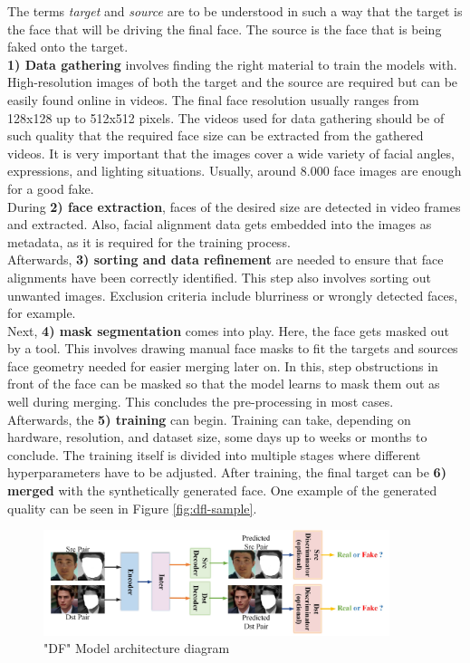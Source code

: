 \documentclass[
  a4paper,  %
  twoside,  %
  bibliography=totoc,
  headsepline,
  cleardoublepage=empty,
  parskip=half,
  draft=false
]{scrbook}
\begin{document}
The terms \textit{target} and \textit{source} are to be understood in such a way that the target is the face that will be driving the final face. The source is the face that is being faked onto the target. \\
\textbf{1) Data gathering} involves finding the right material to train the models with. High-resolution images of both the target and the source are required but can be easily found online in videos. The final face resolution usually ranges from 128x128 up to 512x512 pixels. The videos used for data gathering should be of such quality that the required face size can be extracted from the gathered videos. It is very important that the images cover a wide variety of facial angles, expressions, and lighting situations. Usually, around 8.000 face images are enough for a good fake. \\
During \textbf{2) face extraction}, faces of the desired size are detected in video frames and extracted. Also, facial alignment data gets embedded into the images as metadata, as it is required for the training process. \\
Afterwards, \textbf{3) sorting and data refinement} are needed to ensure that face alignments have been correctly identified. This step also involves sorting out unwanted images. Exclusion criteria include blurriness or wrongly detected faces, for example. \\
Next, \textbf{4) mask segmentation} comes into play. Here, the face gets masked out by a tool. This involves drawing manual face masks to fit the targets and sources face geometry needed for easier merging later on. In this, step obstructions in front of the face can be masked so that the model learns to mask them out as well during merging.  This concludes the pre-processing in most cases.\\
Afterwards, the \textbf{5) training} can begin. Training can take, depending on hardware, resolution, and dataset size, some days up to weeks or months to conclude. The training itself is divided into multiple stages where different hyperparameters have to be adjusted. After training, the final target can be \textbf{6) merged} with the synthetically generated face. One example of the generated quality can be seen in Figure \ref{fig:dfl-sample}.
\begin{figure}[h]
  \centering
  \includegraphics[width=0.9\textwidth]{./graphics/images/df-model-arch.png}
  \caption{"DF" Model architecture diagram \cite{perovDeepFaceLabIntegratedFlexible2021}}
  \label{fig:df-model-diagram}
\end{figure}
\end{document}
